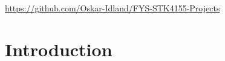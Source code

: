 \documentclass[aps,pra,english,notitlepage,reprint,nofootinbib]{revtex4-1}  %
\begin{document}
\maketitle
\onecolumngrid
\begin{center}
    \vspace{-15pt}
    \href{https://github.com/Oskar-Idland/FYS-STK4155-Projects}{https://github.com/Oskar-Idland/FYS-STK4155-Projects}%
    \vspace{5pt}
\end{center}
\twocolumngrid


\section{Introduction}\label{sec:introduction}

% 

\end{document}
